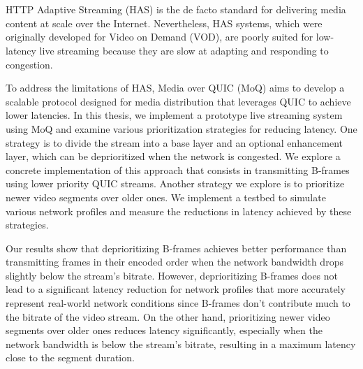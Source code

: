 \chapter{\abstractname}

HTTP Adaptive Streaming (HAS) is the de facto standard for delivering media content at scale over the Internet. Nevertheless, HAS systems, which were originally developed for Video on Demand (VOD), are poorly suited for low-latency live streaming because they are slow at adapting and responding to congestion.

To address the limitations of HAS, Media over QUIC (MoQ) aims to develop a scalable protocol designed for media distribution that leverages QUIC to achieve lower latencies. In this thesis, we implement a prototype live streaming system using MoQ and examine various prioritization strategies for reducing latency. One strategy is to divide the stream into a base layer and an optional enhancement layer, which can be deprioritized when the network is congested. We explore a concrete implementation of this approach that consists in transmitting B-frames using lower priority QUIC streams. Another strategy we explore is to prioritize newer video segments over older ones. We implement a testbed to simulate various network profiles and measure the reductions in latency achieved by these strategies. 

Our results show that deprioritizing B-frames achieves better performance than transmitting frames in their encoded order when the network bandwidth drops slightly below the stream's bitrate. However, deprioritizing B-frames does not lead to a significant latency reduction for network profiles that more accurately represent real-world network conditions since B-frames don't contribute much to the bitrate of the video stream. On the other hand, prioritizing newer video segments over older ones reduces latency significantly, especially when the network bandwidth is below the stream's bitrate, resulting in a maximum latency close to the segment duration.